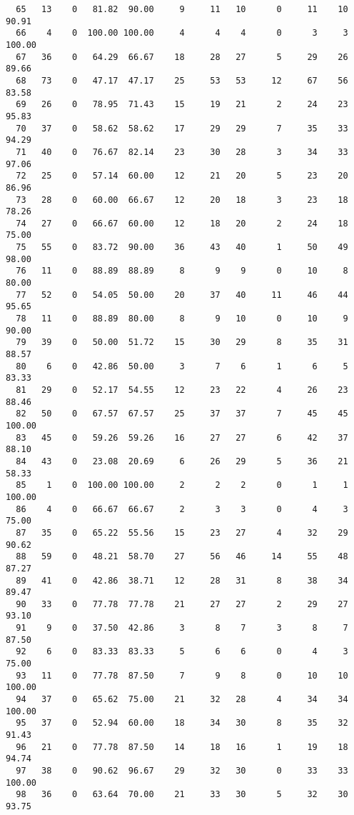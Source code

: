 \begin{verbatim}
  65   13    0   81.82  90.00     9     11   10      0     11    10    90.91
  66    4    0  100.00 100.00     4      4    4      0      3     3   100.00
  67   36    0   64.29  66.67    18     28   27      5     29    26    89.66
  68   73    0   47.17  47.17    25     53   53     12     67    56    83.58
  69   26    0   78.95  71.43    15     19   21      2     24    23    95.83
  70   37    0   58.62  58.62    17     29   29      7     35    33    94.29
  71   40    0   76.67  82.14    23     30   28      3     34    33    97.06
  72   25    0   57.14  60.00    12     21   20      5     23    20    86.96
  73   28    0   60.00  66.67    12     20   18      3     23    18    78.26
  74   27    0   66.67  60.00    12     18   20      2     24    18    75.00
  75   55    0   83.72  90.00    36     43   40      1     50    49    98.00
  76   11    0   88.89  88.89     8      9    9      0     10     8    80.00
  77   52    0   54.05  50.00    20     37   40     11     46    44    95.65
  78   11    0   88.89  80.00     8      9   10      0     10     9    90.00
  79   39    0   50.00  51.72    15     30   29      8     35    31    88.57
  80    6    0   42.86  50.00     3      7    6      1      6     5    83.33
  81   29    0   52.17  54.55    12     23   22      4     26    23    88.46
  82   50    0   67.57  67.57    25     37   37      7     45    45   100.00
  83   45    0   59.26  59.26    16     27   27      6     42    37    88.10
  84   43    0   23.08  20.69     6     26   29      5     36    21    58.33
  85    1    0  100.00 100.00     2      2    2      0      1     1   100.00
  86    4    0   66.67  66.67     2      3    3      0      4     3    75.00
  87   35    0   65.22  55.56    15     23   27      4     32    29    90.62
  88   59    0   48.21  58.70    27     56   46     14     55    48    87.27
  89   41    0   42.86  38.71    12     28   31      8     38    34    89.47
  90   33    0   77.78  77.78    21     27   27      2     29    27    93.10
  91    9    0   37.50  42.86     3      8    7      3      8     7    87.50
  92    6    0   83.33  83.33     5      6    6      0      4     3    75.00
  93   11    0   77.78  87.50     7      9    8      0     10    10   100.00
  94   37    0   65.62  75.00    21     32   28      4     34    34   100.00
  95   37    0   52.94  60.00    18     34   30      8     35    32    91.43
  96   21    0   77.78  87.50    14     18   16      1     19    18    94.74
  97   38    0   90.62  96.67    29     32   30      0     33    33   100.00
  98   36    0   63.64  70.00    21     33   30      5     32    30    93.75

\end{verbatim}
